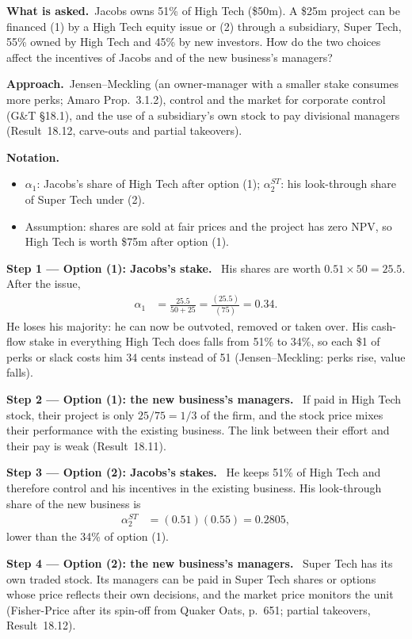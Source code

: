 \documentclass[11pt,a4paper]{article}
\newcommand{\notation}{\par\noindent\textbf{Notation.}}
\newcommand{\step}[2]{\par\medskip\noindent\textbf{Step #1 --- #2.}~}
\newcommand{\asked}{\par\medskip\noindent\textbf{What is asked.}~}
\newcommand{\approach}{\par\smallskip\noindent\textbf{Approach.}~}
\begin{document}
\asked Jacobs owns 51\% of High Tech (\$50m). A \$25m project can be financed (1) by a High Tech equity issue or (2) through a subsidiary, Super Tech, 55\% owned by High Tech and 45\% by new investors. How do the two choices affect the incentives of Jacobs and of the new business's managers?

\approach Jensen--Meckling (an owner-manager with a smaller stake consumes more perks; Amaro Prop.~3.1.2), control and the market for corporate control (G\&T \S18.1), and the use of a subsidiary's own stock to pay divisional managers (Result~18.12, carve-outs and partial takeovers).

\notation
\begin{itemize}
  \item $\alpha_1$: Jacobs's share of High Tech after option (1); $\alpha_2^{ST}$: his look-through share of Super Tech under (2).
  \item Assumption: shares are sold at fair prices and the project has zero NPV, so High Tech is worth \$75m after option (1).
\end{itemize}

\step{1}{Option (1): Jacobs's stake} His shares are worth $0.51\times50=25.5$. After the issue,
\begin{align}
  \alpha_1 &= \frac{25.5}{50+25} = \frac{(25.5)}{(75)} = 0.34. \label{r8be8-a1}
\end{align}
He loses his majority: he can now be outvoted, removed or taken over. His cash-flow stake in everything High Tech does falls from 51\% to 34\%, so each \$1 of perks or slack costs him 34 cents instead of 51 (Jensen--Meckling: perks rise, value falls).

\step{2}{Option (1): the new business's managers} If paid in High Tech stock, their project is only $25/75=1/3$ of the firm, and the stock price mixes their performance with the existing business. The link between their effort and their pay is weak (Result~18.11).

\step{3}{Option (2): Jacobs's stakes} He keeps 51\% of High Tech and therefore control and his incentives in the existing business. His look-through share of the new business is
\begin{align}
  \alpha_2^{ST} &= (0.51)(0.55) = 0.2805, \label{r8be8-a2}
\end{align}
lower than the 34\% of option (1).

\step{4}{Option (2): the new business's managers} Super Tech has its own traded stock. Its managers can be paid in Super Tech shares or options whose price reflects their own decisions, and the market price monitors the unit (Fisher-Price after its spin-off from Quaker Oats, p.~651; partial takeovers, Result~18.12).
\end{document}
